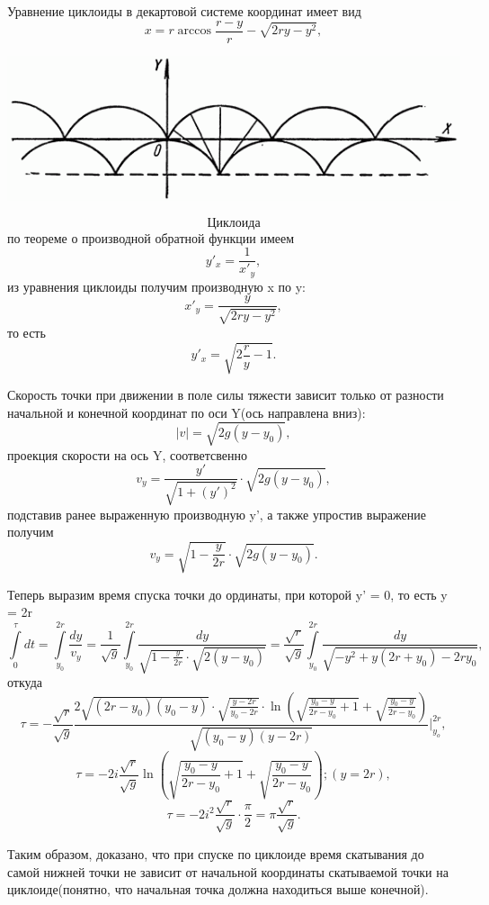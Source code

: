 \documentclass[a4paper, 12pt]{article}
\begin{document}
Уравнение циклоиды в декартовой системе координат имеет вид
\[x = r\arccos\frac{r-y}{r} - \sqrt{2ry - y^2},\]
\begin{center}
\includegraphics[scale=1.3]{arch}
\end{center}
\[\textit{Циклоида}\]
по теореме о производной обратной функции имеем
\[y'_x = \frac{1}{x'_y},\]
из уравнения циклоиды получим производную x по y:
\[x'_y = \frac{y}{\sqrt{2ry - y^2}},\]
то есть
\[y'_x = \sqrt{2\frac{r}{y} - 1}.\]

Скорость точки при движении в поле силы тяжести зависит только от разности начальной и конечной координат по оси Y(ось направлена вниз):
\[|v| = \sqrt{2g(y - y_0)},\]
проекция скорости на ось Y, соответсвенно
\[v_y = \frac{y'}{\sqrt{1 + (y')^2}}\cdot\sqrt{2g(y - y_0)},\]
подставив ранее выраженную производную y', а также упростив выражение получим
\[v_y = \sqrt{1 - \frac{y}{2r}}\cdot\sqrt{2g(y - y_0)}.\]

Теперь выразим время спуска точки до ординаты, при которой y' = 0, то есть y = 2r
\[\displaystyle\int\limits_0^\tau dt = \int\limits_{y_0}^{2r} \frac{dy}{v_y} = \frac{1}{\sqrt{g}}\int\limits_{y_0}^{2r} \frac{dy}{\sqrt{1 - \frac{y}{2r}}\cdot\sqrt{2(y - y_0)}} = \frac{\sqrt{r}}{\sqrt{g}}\int\limits_{y_0}^{2r} \frac{dy}{\sqrt{-y^2 + y(2r + y_0) - 2ry_0}},\]
откуда
\[\tau = -\frac{\sqrt{r}}{\sqrt{g}}\frac{2\sqrt{(2r - y_0)(y_0 - y)}\cdot\sqrt{\frac{y - 2r}{y_0 - 2r}}\cdot\ln (\sqrt{\frac{y_0-y}{2r - y_0}+1} + \sqrt{\frac{y_0 - y}{2r - y_0}})}{\sqrt{(y_0 - y)(y - 2r)}}\Bigg|_{y_o}^{2r},\]
\[\tau = -2i\frac{\sqrt{r}}{\sqrt{g}}\ln (\sqrt{\frac{y_0-y}{2r - y_0}+1} + \sqrt{\frac{y_0 - y}{2r - y_0}}); (y = 2r),\]
\[\tau = -2i^2\frac{\sqrt{r}}{\sqrt{g}} \cdot \frac{\pi}{2} = \pi\frac{\sqrt{r}}{\sqrt{g}}.\]

Таким образом, доказано, что при спуске по циклоиде время скатывания до самой нижней точки не зависит от начальной координаты скатываемой точки на циклоиде(понятно, что начальная точка должна находиться выше конечной).


\newpage
\end{document}
